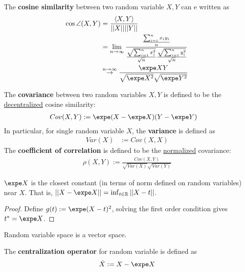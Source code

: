 \documentclass{article}
\begin{document}
   	\begin{definition}
   		The \textbf{cosine similarity} between two random variable $X, Y$ can e written as
   		\begin{align}
   			\cos \angle (X, Y) &= \frac{\inner{X}{Y}}{\norm{X} \norm{Y}} \\
   			&= \lim_{n \to \infty} \frac{\frac{\sum_{i=1}^n x_i y_i}{n}}{\frac{\sqrt{\sum_{i=1}^n x_i^2}}{\sqrt{n}} \frac{\sqrt{\sum_{i=1}^n y_i^2}}{\sqrt{n}}} \\
   			&\overset{n \to \infty}{\to} \frac{\expe XY}{\sqrt{\expe X^2} \sqrt{\expe Y^2}}
   		\end{align}
   	\end{definition}
   	
   	\begin{definition}
   		The \textbf{covariance} between two random variables $X, Y$ is defined to be the \ul{decentralized} cosine similarity:
   		\begin{align}
   			Cov(X, Y) &:= \expe (X - \expe X)(Y - \expe Y)
   		\end{align}
   		In particular, for single random variable $X$, the \textbf{variance} is defined as
   		\begin{align}
   			Var(X) &:= Cov(X, X)
   		\end{align}
   		The \textbf{coefficient of correlation} is defined to be the \ul{normalized} covariance:
   		\begin{align}
   			\rho(X, Y) := \frac{Cov(X, Y)}{\sqrt{Var(X)}\sqrt{Var(Y)}}
   		\end{align}
   	\end{definition}
   	
   	\begin{proposition}
   		$\expe X$ is the closest constant (in terms of norm defined on random variables) near $X$. That is, $\norm{X - \expe X} = \inf_{t \in \R} \norm{X - t}$.
   	\end{proposition}
   	
   	\begin{proof}
   		Define $g(t) := \expe (X - t)^2$, solving the first order condition gives $t^* = \expe X$.
   	\end{proof}

   	\begin{proposition}
   		Random variable space is a vector space.
   	\end{proposition}

   	\begin{definition}
   		The \textbf{centralization operator} for random variable is defined as
   		\begin{align}
   			\dot{X} := X - \expe X
   		\end{align}
   	\end{definition}
   	
\end{document}
